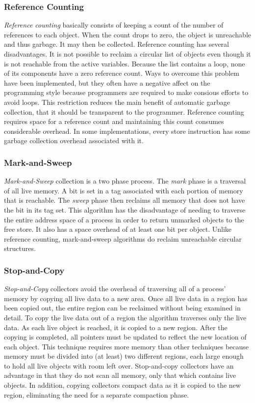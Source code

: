 \subsubsection{Reference Counting}

{\em Reference counting} \cite{Collins60} basically consists of
keeping a count of the number of references to each object.  When the
count drops to zero, the object is unreachable and thus garbage.  It
may then be collected.  Reference counting has several disadvantages.
It is not possible to reclaim a circular list of objects even though
it is not reachable from the active variables.  Because the list
contains a loop, none of its components have a zero reference count.
Ways to overcome this problem have been implemented, but they often
have a negative affect on the programming style because programmers
are required to make consious efforts to avoid loops.  This
restriction reduces the main benefit of automatic garbage collection,
that it should be transparent to the programmer.  Reference counting
requires space for a reference count and maintaining this count
consumes considerable overhead.  In some implementations, every store
instruction has some garbage collection overhead associated with it.

\subsubsection{Mark-and-Sweep}

{\em Mark-and-Sweep} collection is a two phase process.  The {\em
mark} phase is a traversal of all live memory.  A bit is set in a tag
associated with each portion of memory that is reachable.  The {\em
sweep} phase then reclaims all memory that does not have the bit in
its tag set.  This algorithm has the disadvantage of needing to
traverse the entire address space of a process in order to return
unmarked objects to the free store.  It also has a space overhead of
at least one bit per object.  Unlike reference counting,
mark-and-sweep algorithms do reclaim unreachable circular structures.

\subsubsection{Stop-and-Copy}

{\em Stop-and-Copy} collectors avoid the overhead of traversing all of
a process' memory by copying all live data to a new area.  Once all
live data in a region has been copied out, the entire region can be
reclaimed without being examined in detail.  To copy the live data out
of a region the algorithm traverses only the live data.  As each live
object is reached, it is copied to a new region.  After the copying is
completed, all pointers must be updated to reflect the new location of
each object.  This technique requires more memory than other
techniques because memory must be divided into (at least) two
different regions, each large enough to hold all live objects with
room left over.  Stop-and-copy collectors have an advantage in that
they do not scan all memory, only that which contains live objects.
In addition, copying collectors compact data as it is copied to the
new region, eliminating the need for a separate compaction phase.

